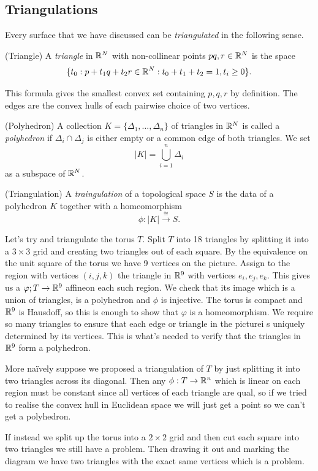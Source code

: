 \documentclass{article}
\newcommand{\homeo}{\overset{\cong}{\longrightarrow}}
\begin{document}
\subsection{Triangulations}
Every surface that we have discussed can be \textit{triangulated} in the following sense.
\begin{definition}
	(Triangle) A \textit{triangle} in $ \mathbb{R}^N $ with non-collinear points $ pq,r \in \mathbb{R}^N $ is the space
	\[
		\{ t_0: p + t_1q+t_2r\in \mathbb{R}^N:t_0+t_1+t_2 =1, t_i\ge 0\}.
	\]
\end{definition}
\begin{remark}
  This formula gives the smallest convex set containing $ p,q,r $ by definition. The edges are the convex hulls of each pairwise choice of two vertices.
\end{remark}
\begin{definition}
	(Polyhedron) A collection $ K = \{\Delta_1,\dots, \Delta_n\} $ of triangles in $ \mathbb{R}^N $ is called a \textit{polyhedron} if $ \Delta_i\cap \Delta_j $ is either empty or a common edge of both triangles. We set
	\[
		|K| = \bigcup_{i=1}^n \Delta_i
	\]
	as a subspace of $ \mathbb{R}^N $.
\end{definition}
\begin{definition}
	(Triangulation) A \textit{traingulation} of a topological space $ S $ is the data of a polyhedron $ K $ together with a homeomorphism
	\[
	  \phi : |K| \homeo S.
	\]
\end{definition}
\begin{example}
  Let's try and triangulate the torus $ T $. Split $ T $ into 18 triangles by splitting it into a $ 3\times 3 $ grid and creating two triangles out of each square. By the equivalence on the unit square of the torus we have 9 vertices on the picture. Assign to the region with vertices $ (i,j,k) $ the triangle in $ \mathbb{R}^9 $ with vertices $ e_i,e_j,e_k $. This gives us a $ \varphi;T\to \mathbb{R}^9 $ affineon each such region. We check that its image which is a union of triangles, is a polyhedron and $ \phi $ is injective. The torus is compact and $ \mathbb{R}^9 $ is Hausdoff, so this is enough to show that $ \varphi $ is a homeomorphism. We require so many triangles to ensure that each edge or triangle in the picturei s uniquely determined by its vertices. This is what's needed to verify that the triangles in $ \mathbb{R}^9 $ form a polyhedron.\par
  More na\"ively suppose we proposed a triangulation of $ T $ by just splitting it into two triangles across its diagonal. Then any $ \phi:T\to \mathbb{R}^n $ which is linear on each region must be constant since all vertices of each triangle are qual, so if we tried to realise the convex hull in Euclidean space we will just get a point so we can't get a polyhedron. \par
  If instead we split up the torus into a $ 2\times 2 $ grid and then cut each square into two triangles we still have a problem. Then drawing it out and marking the diagram we have two triangles with the exact same vertices which is a problem.
\end{example}
\end{document}
